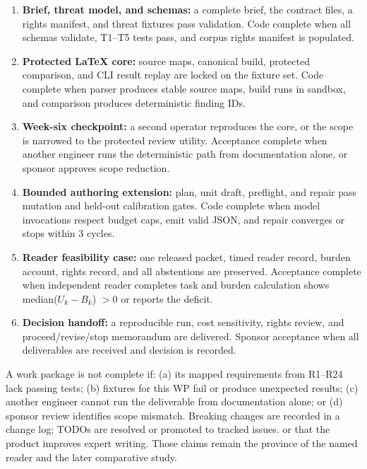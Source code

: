 \begin{enumerate}
\item \textbf{Brief, threat model, and schemas:} a complete brief, the contract
      files, a rights manifest, and threat fixtures pass validation. Code
      complete when all schemas validate, T1--T5 tests pass, and corpus rights
      manifest is populated.
\item \textbf{Protected LaTeX core:} source maps, canonical build, protected
      comparison, and CLI result replay are locked on the fixture set. Code
      complete when parser produces stable source maps, build runs in sandbox,
      and comparison produces deterministic finding IDs.
\item \textbf{Week-six checkpoint:} a second operator reproduces the core, or
      the scope is narrowed to the protected review utility. Acceptance
      complete when another engineer runs the deterministic path from
      documentation alone, or sponsor approves scope reduction.
\item \textbf{Bounded authoring extension:} plan, unit draft, preflight, and
      repair pass mutation and held-out calibration gates. Code complete when
      model invocations respect budget caps, emit valid JSON, and repair
      converges or stops within 3 cycles.
\item \textbf{Reader feasibility case:} one released packet, timed reader
      record, burden account, rights record, and all abstentions are preserved.
      Acceptance complete when independent reader completes task and burden
      calculation shows median($U_k - B_k$) $> 0$ or reports the deficit.
\item \textbf{Decision handoff:} a reproducible run, cost sensitivity, rights
      review, and proceed/revise/stop memorandum are delivered. Sponsor
      acceptance when all deliverables are received and decision is recorded.
\end{enumerate}

A work package is not complete if: (a) its mapped requirements from R1--R24
lack passing tests; (b) fixtures for this WP fail or produce unexpected
results; (c) another engineer cannot run the deliverable from documentation
alone; or (d) sponsor review identifies scope mismatch. Breaking changes are
recorded in a change log; TODOs are resolved or promoted to tracked issues.
or that the product improves expert writing. Those claims remain the province
of the named reader and the later comparative study.

